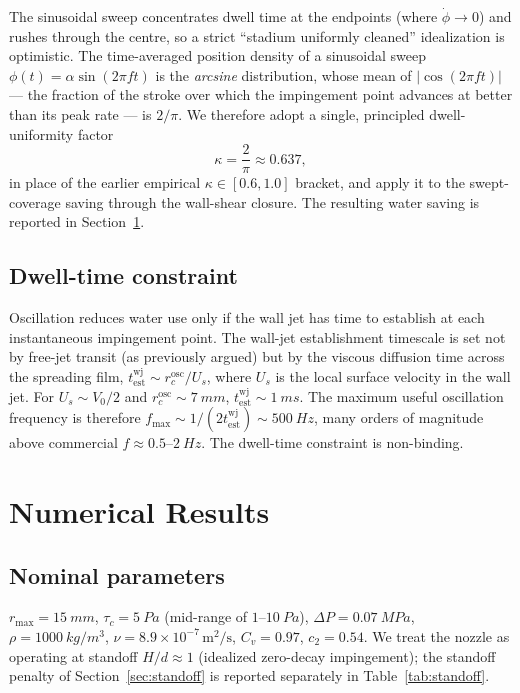 \documentclass[aps,prfluids,reprint,amsmath,amssymb,floatfix]{revtex4-2}
\begin{document}
The sinusoidal sweep concentrates dwell time at the endpoints (where
$\dot\phi \to 0$) and rushes through the centre, so a strict ``stadium
uniformly cleaned'' idealization is optimistic. The time-averaged position
density of a sinusoidal sweep $\phi(t) = \alpha\sin(2\pi f t)$ is the
\emph{arcsine} distribution, whose mean of $|\cos(2\pi f t)|$ --- the fraction
of the stroke over which the impingement point advances at better than its
peak rate --- is $2/\pi$. We therefore adopt a single, principled
dwell-uniformity factor
\begin{equation}
  \kappa = \frac{2}{\pi} \approx 0.637,
  \label{eq:kappa}
\end{equation}
in place of the earlier empirical $\kappa \in [0.6, 1.0]$ bracket, and apply
it to the swept-coverage saving through the wall-shear closure. The resulting
water saving is reported in Section~\ref{sec:numerics}.

\subsection{Dwell-time constraint}

Oscillation reduces water use only if the wall jet has time to establish
at each instantaneous impingement point. The wall-jet establishment
timescale is set not by free-jet transit (as previously argued) but by
the viscous diffusion time across the spreading film,
$t_\mathrm{est}^\mathrm{wj} \sim r_c^\mathrm{osc}/U_s$, where
$U_s$ is the local surface velocity in the wall jet. For $U_s \sim V_0/2$
and $r_c^\mathrm{osc} \sim \SI{7}{mm}$, $t_\mathrm{est}^\mathrm{wj}
\sim \SI{1}{ms}$. The maximum useful oscillation frequency is therefore
$f_\mathrm{max} \sim 1/(2 t_\mathrm{est}^\mathrm{wj}) \sim \SI{500}{Hz}$,
many orders of magnitude above commercial $f \approx 0.5$--$\SI{2}{Hz}$.
The dwell-time constraint is non-binding.

\section{Numerical Results}
\label{sec:numerics}

\subsection{Nominal parameters}

$r_\mathrm{max} = \SI{15}{mm}$, $\tau_c = \SI{5}{Pa}$ (mid-range of
$1$--$\SI{10}{Pa}$), $\Delta P = \SI{0.07}{MPa}$, $\rho = \SI{1000}{kg/m^3}$,
$\nu = 8.9\times 10^{-7}\,\mathrm{m^2/s}$, $C_v = 0.97$, $c_2 = 0.54$.
We treat the nozzle as operating at standoff $H/d \approx 1$ (idealized
zero-decay impingement); the standoff penalty of Section~\ref{sec:standoff}
is reported separately in Table~\ref{tab:standoff}.
\end{document}
